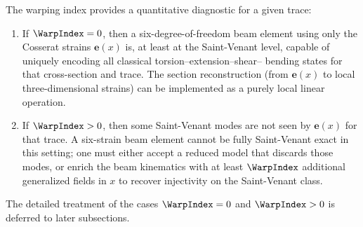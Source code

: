 \begin{remark}
\label{rem:warping-index-implementation}
The warping index provides a quantitative diagnostic for a given trace:
\begin{enumerate}
  \item If $\WarpIndex = 0$, then a six-degree-of-freedom beam element using 
  only the Cosserat strains $\bm{e}(x)$ is, at least at the Saint-Venant 
  level, capable of uniquely encoding all classical torsion–extension–shear–
  bending states for that cross-section and trace. The section reconstruction 
  (from $\bm{e}(x)$ to local three-dimensional strains) can be implemented as 
  a purely local linear operation.

  \item If $\WarpIndex > 0$, then some Saint-Venant modes are not seen by 
  $\bm{e}(x)$ for that trace. A six-strain beam element cannot be fully 
  Saint-Venant exact in this setting; one must either accept a reduced model 
  that discards those modes, or enrich the beam kinematics with at least 
  $\WarpIndex$ additional generalized fields in $x$ to recover injectivity on 
  the Saint-Venant class.
\end{enumerate}
The detailed treatment of the cases $\WarpIndex=0$ and $\WarpIndex>0$ is 
deferred to later subsections.
\end{remark}


